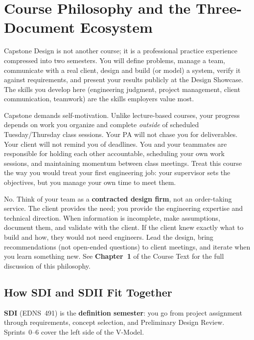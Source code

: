 \section{Course Philosophy and the Three-Document Ecosystem}

Capstone Design is not another course; it is a professional practice experience compressed into two semesters. You will define problems, manage a team, communicate with a real client, design and build (or model) a system, verify it against requirements, and present your results publicly at the Design Showcase. The skills you develop here (engineering judgment, project management, client communication, teamwork) are the skills employers value most.

\begin{faqbox}
Capstone demands self-motivation. Unlike lecture-based courses, your progress depends on work you organize and complete \emph{outside} of scheduled Tuesday/Thursday class sessions. Your PA will not chase you for deliverables. Your client will not remind you of deadlines. You and your teammates are responsible for holding each other accountable, scheduling your own work sessions, and maintaining momentum between class meetings. Treat this course the way you would treat your first engineering job: your supervisor sets the objectives, but you manage your own time to meet them.
\end{faqbox}

\begin{faqbox}
No. Think of your team as a \textbf{contracted design firm}, not an order-taking service. The client provides the need; you provide the engineering expertise and technical direction. When information is incomplete, make assumptions, document them, and validate with the client. If the client knew exactly what to build and how, they would not need engineers. Lead the design, bring recommendations (not open-ended questions) to client meetings, and iterate when you learn something new. See \textbf{Chapter~1} of the Course Text for the full discussion of this philosophy.
\end{faqbox}

\subsection{How SDI and SDII Fit Together}
\textbf{SDI} (EDNS~491) is the \textbf{definition semester}: you go from project assignment through requirements, concept selection, and Preliminary Design Review. Sprints~0--6 cover the left side of the V-Model.

